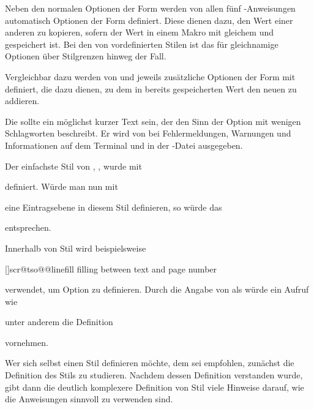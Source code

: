 Neben den normalen Optionen der Form
 werden von allen fünf
-Anweisungen automatisch Optionen der Form
 definiert. Diese dienen
dazu, den Wert einer anderen  zu kopieren, sofern der
Wert in einem Makro mit gleichem  und 
gespeichert ist. Bei den von  vordefinierten Stilen ist das
für gleichnamige Optionen über Stilgrenzen hinweg der Fall.

Vergleichbar dazu werden von  und
 jeweils zusätzliche Optionen der Form
 mit definiert, die dazu dienen, zu
dem in  bereits
gespeicherten Wert den neuen  zu addieren.

Die  sollte ein möglichst kurzer Text sein, der den Sinn der
Option mit wenigen Schlagworten beschreibt. Er wird von  bei
Fehlermeldungen, Warnungen und Informationen auf dem Terminal und in der
-Datei ausgegeben.
\begin{Example}
Der einfachste Stil von , , wurde mit
\begin{lstcode}
\end{lstcode}
definiert. Würde man nun mit
\begin{lstcode}
\end{lstcode}
eine Eintragsebene  in diesem Stil definieren, so würde das%
\iffalse unter anderem\fi%
\begin{lstcode}
  \def\dummytocdepth{1}
  \def\l@dummy#1#2{}
\end{lstcode}
entsprechen.

Innerhalb von Stil  wird beispielsweise
\begin{lstcode}
    [\TOCLineLeaderFill]{scr@tso@}{@linefill}%
    {filling between text and page number}%
\end{lstcode}
verwendet, um Option  zu definieren. Durch die Angabe von
 als  würde ein
Aufruf wie
\begin{lstcode}
\end{lstcode}
unter anderem die Definition
\begin{lstcode}
  \def\scr@tso@part@linefill{\TOCLineLeaderFill}
\end{lstcode}
vornehmen.
\end{Example}
Wer sich selbst einen Stil definieren möchte, dem sei
empfohlen, zunächst die Definition des Stils  zu
studieren. Nachdem dessen Definition verstanden wurde, gibt dann die deutlich
komplexere Definition von Stil  viele Hinweise darauf, wie die
Anweisungen sinnvoll zu verwenden sind.

